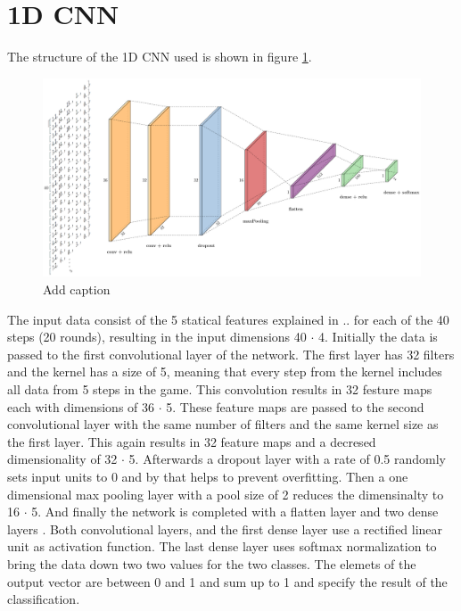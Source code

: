 \section{1D CNN}
The structure of the 1D CNN used is shown in figure \ref{fig:1dCnnStructure}.
\begin{figure}[H]
	\centering
	\includegraphics[width=15cm]{images/1dCnnStructure.png}
	\caption[Bild kurz]{Add caption}
	\label{fig:1dCnnStructure}
\end{figure}
The input data consist of the 5 statical features explained in ..  for each of the 40 steps (20 rounds), resulting in the input dimensions 40 $\cdot$ 4. Initially the data is passed to the first convolutional layer of the network. The first layer has 32 filters and the kernel has a size of 5, meaning that every step from the kernel includes all data from 5 steps in the game. This convolution results in 32 festure maps each with dimensions of 36 $\cdot$ 5. These feature maps are passed to the second convolutional layer with the same number of filters and the same kernel size as the first layer. This again results in 32 feature maps and a decresed dimensionality of 32 $\cdot$ 5. Afterwards a dropout layer with a rate of 0.5 randomly sets input units to 0 and by that helps to prevent overfitting. Then a one dimensional max pooling layer with a pool size of 2 reduces the dimensinalty to 16 $\cdot$ 5.  And finally the network is completed with a flatten layer and two dense layers . Both convolutional layers, and the first dense layer use a rectified linear unit as activation function. The last dense layer uses softmax normalization to bring the data down two two values for the two classes. The elemets of the output vector are between 0 and 1 and sum up to 1 and specify the result of the classification.  

